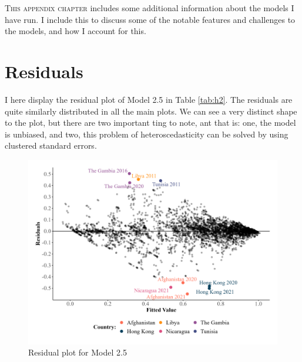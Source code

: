 \lettrine{T}{his appendix chapter} includes some additional information about the models I have run. I include this to discuss some of the notable features and challenges to the models, and how I account for this.

\section{Residuals}
I here display the residual plot of Model 2.5 in Table \ref{tab:h2}. The residuals are quite similarly distributed in all the main plots. We can see a very distinct shape to the plot, but there are two important ting to note, ant that is: one, the model is unbiased, and two, this problem of heteroscedasticity can be solved by using clustered standard errors.

\begin{figure}[H]
    \centering
    \includegraphics[width=.9\linewidth]{graphics/residuals.jpeg}
    \caption{Residual plot for Model 2.5}
    \label{fig:residuals}
\end{figure}